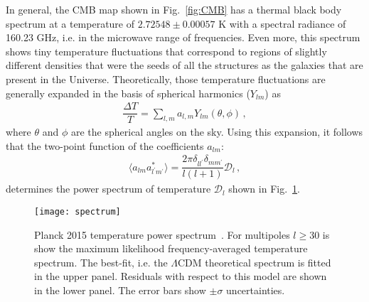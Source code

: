 \begin{itemize}
In general, the CMB map shown in Fig.~\ref{fig:CMB} has a thermal black body spectrum at a temperature of $2.72548 \pm 0.00057$ K with a spectral radiance of 160.23 GHz, i.e. in the microwave range of frequencies. Even more, this spectrum  shows tiny temperature fluctuations that correspond to regions of slightly different densities that were the seeds of all the structures as the galaxies that are present in the Universe. 
%
Theoretically, those temperature fluctuations are generally expanded in the basis of spherical harmonics ($Y_{lm}$) as~\cite{Dodelson:1282338, Kolb:1990vq}
%
\begin{align}
\dfrac{\Delta T}{T}=\sum_{l,m} a_{l,m} Y_{lm}(\theta,\phi) \,,
\end{align}
%
where $\theta$ and $\phi$ are the spherical angles on the sky. Using this expansion, it follows that the two-point function of the coefficients $a_{lm}$:
%
\begin{align}
\langle a_{lm} a^*_{l^{'}m^{'}} \rangle = \dfrac{2\pi \delta_{ll^{'}}\delta_{mm^{'}}}{l(l+1)} \mathcal{D}_l \,,
\end{align}
%
determines the power spectrum of temperature $\mathcal{D}_l$ shown in Fig.~\ref{fig:T-spectrum}.
%
\begin{figure}[h]
\begin{center}
\texttt{[image: spectrum]}
\end{center}
\caption{Planck 2015 temperature power spectrum~\cite{Ade:2015xua}. For multipoles $l \geq 30$ is show the maximum likelihood frequency-averaged temperature spectrum. The best-fit, i.e. the $\Lambda$CDM theoretical spectrum is fitted in the upper panel. Residuals with respect to this model are shown in the lower panel. The error bars show $\pm \sigma$ uncertainties.}
\label{fig:T-spectrum}
\end{figure}


\end{itemize}
